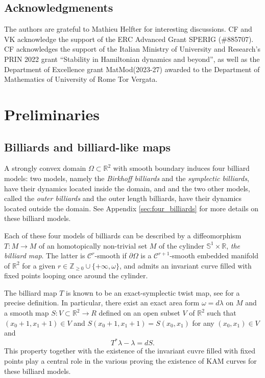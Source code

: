 \documentclass[10pt]{article}
\newcommand{\Z}{\mathbb{Z}}
\newcommand{\R}{\mathbb{R}}
\renewcommand{\SS}{\mathbb{S}}
\begin{document}
\subsection*{Acknowledgmenents}
The authors are grateful to Mathieu Helfter for interesting discussions.
CF and VK acknowledge the support of the ERC Advanced Grant SPERIG (\#885707). CF acknowledges the support of the Italian Ministry of University and Research’s PRIN 2022 grant “Stability in Hamiltonian dynamics and beyond”, as well as the Department of Excellence grant MatMod\@TOV (2023-27) awarded to the Department of Mathematics of University of Rome Tor Vergata.

\section{Preliminaries}

\subsection{Billiards and billiard-like maps}

A strongly convex domain $\Omega\subset\R^2$ with smooth boundary induces four billiard models: two models, namely the \textit{Birkhoff billiards} and the \textit{symplectic billiards}, have their dynamics located inside the domain, and and the two other models, called the \textit{outer billiards} and the outer length billiards, have their dynamics located outside the domain. See Appendix \ref{sec:four_billiards} for more details on these billiard models.

Each of these four models of billiards can be described by a diffeomorphism $T:M\to M$ of an homotopically non-trivial set $M$ of the cylinder $\SS^1\times\R$, \textit{the billiard map}. The latter is $\mathscr C^r$-smooth if $\partial\Omega$ is a $\mathscr C^{r+1}$-smooth embedded manifold of $\R^2$ for a given $r\in\Z_{\geq 0}\cup\{+\infty,\omega\}$, and admits an invariant curve filled with fixed points looping once around the cylinder. 

The billiard map $T$ is known to be an exact-symplectic twist map, see \cite{FKS_lecturenotes} for a precise definition. In particular, there exist an exact area form $\omega=d\lambda$ on $M$ and a smooth map $S:V\subset\R^2\to R$ defined on an open subset $V$ of $\R^2$ such that $(x_0+1,x_1+1)\in V$ and $S(x_0+1,x_1+1)=S(x_0,x_1)$ for any $(x_0,x_1)\in V$ and 
\[
T^\ast\lambda-\lambda = dS.
\]
This property together with the existence of the invariant cuvre filled with fixed points play a central role in the various proving the existence of KAM curves for these billiard models. 
\end{document}
